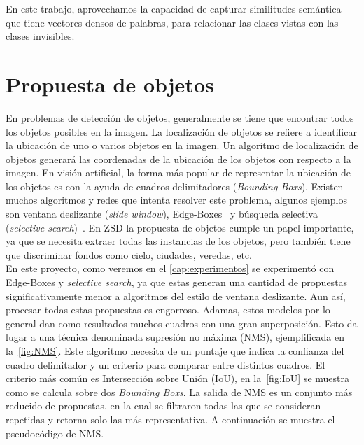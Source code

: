 En este trabajo, aprovechamos la capacidad de capturar similitudes semántica que tiene vectores densos de palabras, para relacionar las clases vistas con las clases invisibles.\\


\section{Propuesta de objetos} \label{sec:propuestadeobjetos}
En problemas de detección de objetos, generalmente se tiene que encontrar todos los objetos posibles en la imagen. La localización de objetos se refiere a identificar la ubicación de uno o varios objetos en la imagen. Un algoritmo de localización de objetos generará las coordenadas de la ubicación de los objetos con respecto a la imagen. En visión artificial, la forma más popular de representar la ubicación de los objetos es con la ayuda de cuadros delimitadores (\textit{Bounding Boxs}). Existen muchos algoritmos y redes que intenta resolver este problema, algunos ejemplos son ventana deslizante (\textit{slide window}), Edge-Boxes~\cite{zitnick2014edge} y búsqueda selectiva (\textit{selective search})~\cite{uijlings2013selective}. En ZSD la propuesta de objetos cumple un papel importante, ya que se necesita extraer todas las instancias de los objetos, pero también tiene que discriminar fondos como cielo, ciudades, veredas, etc.\\

En este proyecto, como veremos en el \autoref{cap:experimentos} se experimentó con Edge-Boxes y \textit{selective search}, ya que estas generan una cantidad de propuestas significativamente menor a algoritmos del estilo de ventana deslizante. Aun así, procesar todas estas propuestas es engorroso. Adamas, estos modelos por lo general dan como resultados muchos cuadros con una gran superposición. Esto da lugar a una técnica denominada supresión no máxima (NMS), ejemplificada en la~\autoref{fig:NMS}. Este algoritmo necesita de un puntaje que indica la confianza del cuadro delimitador y un criterio para comparar entre distintos cuadros. El criterio más común es Intersección sobre Unión (IoU), en la~\autoref{fig:IoU} se muestra como se calcula sobre dos \textit{Bounding Boxs}. La salida de NMS es un conjunto más reducido de propuestas, en la cual se filtraron todas las que se consideran repetidas y retorna solo las más representativa. A continuación se muestra el pseudocódigo de NMS.

\begin{center}
\noindent{}
\end{center}

